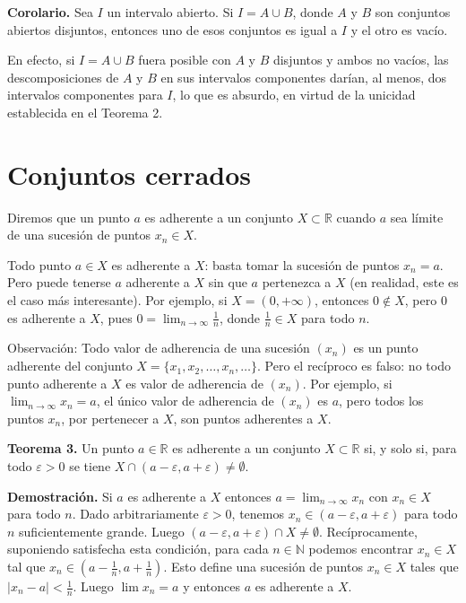 \documentclass[12pt,oneside]{book}
\begin{document}
\textbf{Corolario.} Sea \( I \) un intervalo abierto. Si \( I = A \cup B \), donde \( A \) y \( B \) son conjuntos abiertos disjuntos, entonces uno de esos conjuntos es igual a \( I \) y el otro es vacío.

En efecto, si \( I = A \cup B \) fuera posible con \( A \) y \( B \) disjuntos y ambos no vacíos, las descomposiciones de \( A \) y \( B \) en sus intervalos componentes darían, al menos, dos intervalos componentes para \( I \), lo que es absurdo, en virtud de la unicidad establecida en el Teorema 2.

\section{Conjuntos cerrados}

Diremos que un punto \( a \) es adherente a un conjunto \( X \subset \mathbb{R} \) cuando \( a \) sea límite de una sucesión de puntos \( x_n \in X \).

Todo punto \( a \in X \) es adherente a \( X \): basta tomar la sucesión de puntos \( x_n = a \). Pero puede tenerse \( a \) adherente a \( X \) sin que \( a \) pertenezca a \( X \) (en realidad, este es el caso más interesante). Por ejemplo, si \( X = (0, +\infty) \), entonces \( 0 \notin X \), pero \( 0 \) es adherente a \( X \), pues \( 0 = \lim_{n \to \infty} \frac{1}{n} \), donde \( \frac{1}{n} \in X \) para todo \( n \).

Observación: Todo valor de adherencia de una sucesión \( (x_n) \) es un punto adherente del conjunto \( X = \{x_1, x_2, \dots, x_n, \dots\} \). Pero el recíproco es falso: no todo punto adherente a \( X \) es valor de adherencia de \( (x_n) \). Por ejemplo, si \( \lim_{n \to \infty} x_n = a \), el único valor de adherencia de \( (x_n) \) es \( a \), pero todos los puntos \( x_n \), por pertenecer a \( X \), son puntos adherentes a \( X \).

\textbf{Teorema 3.} Un punto \( a \in \mathbb{R} \) es adherente a un conjunto \( X \subset \mathbb{R} \) si, y solo si, para todo \( \varepsilon > 0 \) se tiene \( X \cap (a - \varepsilon, a + \varepsilon) \neq \emptyset \).

\textbf{Demostración.} Si \( a \) es adherente a \( X \) entonces \( a = \lim_{n \to \infty} x_n \) con \( x_n \in X \) para todo \( n \). Dado arbitrariamente \( \varepsilon > 0 \), tenemos \( x_n \in (a - \varepsilon, a + \varepsilon) \) para todo \( n \) suficientemente grande. Luego \( (a - \varepsilon, a + \varepsilon) \cap X \neq \emptyset \). Recíprocamente, suponiendo satisfecha esta condición, para cada \( n \in \mathbb{N} \) podemos encontrar \( x_n \in X \) tal que \( x_n \in \left( a - \frac{1}{n}, a + \frac{1}{n} \right) \). Esto define una sucesión de puntos \( x_n \in X \) tales que \( |x_n - a| < \frac{1}{n} \). Luego \( \lim x_n = a \) y entonces \( a \) es adherente a \( X \).
\end{document}
